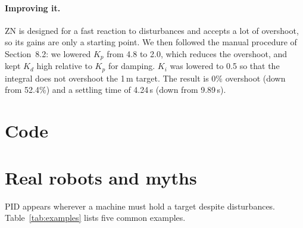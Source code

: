 \documentclass[]{article}
\begin{document}

\paragraph{Improving it.}
ZN is designed for a fast reaction to disturbances and accepts a lot of overshoot, so its gains are only a starting point. We then followed the manual procedure of Section~8.2: we lowered $K_p$ from 4.8 to 2.0, which reduces the overshoot, and kept $K_d$ high relative to $K_p$ for damping. $K_i$ was lowered to 0.5 so that the integral does not overshoot the 1\,m target. The result is 0\% overshoot (down from 52.4\%) and a settling time of 4.24\,s (down from 9.89\,s).




\section{Code}
\section{Real robots and myths}
PID appears wherever a machine must hold a target despite disturbances. Table~\ref{tab:examples} lists five common examples.
\end{document}
